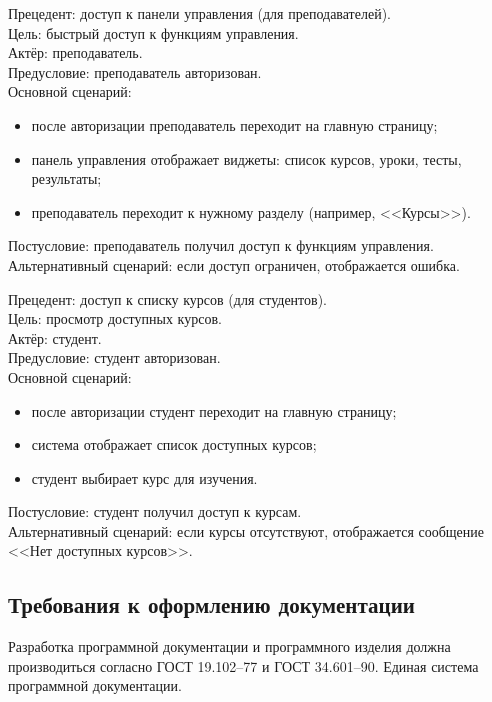 {Прецедент: доступ к панели управления (для преподавателей)}. \\
{Цель}: быстрый доступ к функциям управления. \\
{Актёр}: преподаватель. \\
{Предусловие}: преподаватель авторизован. \\
{Основной сценарий}:
\begin{itemize}
	\item после авторизации преподаватель переходит на главную страницу;
	\item панель управления отображает виджеты: список курсов, уроки, тесты, результаты;
	\item преподаватель переходит к нужному разделу (например, <<Курсы>>).
\end{itemize}
{Постусловие}: преподаватель получил доступ к функциям управления. \\
{Альтернативный сценарий}: если доступ ограничен, отображается ошибка.

{Прецедент: доступ к списку курсов (для студентов)}. \\
{Цель}: просмотр доступных курсов. \\
{Актёр}: студент. \\
{Предусловие}: студент авторизован. \\
{Основной сценарий}:
\begin{itemize}
	\item после авторизации студент переходит на главную страницу;
	\item система отображает список доступных курсов;
	\item студент выбирает курс для изучения.
\end{itemize}
{Постусловие}: студент получил доступ к курсам. \\
{Альтернативный сценарий}: если курсы отсутствуют, отображается сообщение <<Нет доступных курсов>>.


\subsection{Требования к оформлению документации}

Разработка программной документации и программного изделия должна производиться согласно ГОСТ 19.102–77 и ГОСТ 34.601–90. Единая система программной документации.
